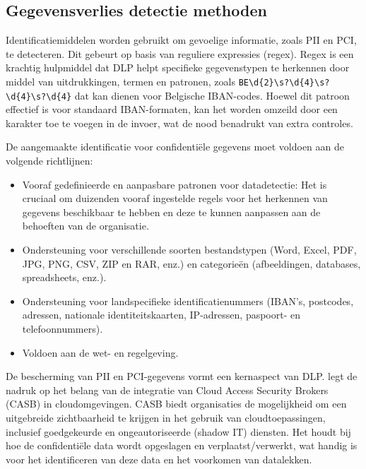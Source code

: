 \subsection{Gegevensverlies detectie methoden}

Identificatiemiddelen worden gebruikt om gevoelige informatie, zoals PII en PCI, te detecteren. 
Dit gebeurt op basis van reguliere expressies (regex). 
Regex is een krachtig hulpmiddel dat DLP helpt specifieke gegevenstypen te herkennen door middel van uitdrukkingen, termen en patronen, 
zoals \texttt{BE\textbackslash d\{2\}\textbackslash s?\textbackslash d\{4\}\textbackslash s?\textbackslash d\{4\}\-\textbackslash s?\textbackslash d\{4\}} 
dat kan dienen voor Belgische IBAN-codes. Hoewel dit patroon effectief is voor standaard IBAN-formaten, kan het worden omzeild door een karakter toe te voegen in de invoer, 
wat de nood benadrukt van extra controles. 

De aangemaakte identificatie voor confidentiële gegevens moet voldoen aan de volgende richtlijnen:

\begin{itemize}
    \item Vooraf gedefinieerde en aanpasbare patronen voor datadetectie: Het is cruciaal om duizenden vooraf ingestelde regels voor het herkennen van gegevens beschikbaar te hebben en deze te kunnen aanpassen aan de behoeften van de organisatie.
    \item Ondersteuning voor verschillende soorten bestandstypen (Word, Excel, PDF, JPG, PNG, CSV, ZIP en RAR, enz.) en categorieën (afbeeldingen, databases, spreadsheets, enz.).
    \item Ondersteuning voor landspecifieke identificatienummers (IBAN's, postcodes, adressen, nationale identiteitskaarten, IP-adressen, pas\-poort- en telefoonnummers).
    \item Voldoen aan de wet- en regelgeving.
\end{itemize}

De bescherming van PII en PCI-gegevens vormt een kernaspect van DLP. \textcite{Wason2020CASB} legt de nadruk op het belang van de integratie van Cloud Access Security Brokers (CASB) in cloudomgevingen. 
CASB biedt organisaties de mogelijkheid om een uitgebreide zichtbaarheid te krijgen in het gebruik van cloudtoepassingen, inclusief goedgekeurde en ongeautoriseerde (shadow IT) diensten. 
Het houdt bij hoe de confidentiële data wordt opgeslagen en verplaatst/verwerkt, wat handig is voor het identificeren van deze data en het voorkomen van datalekken.

